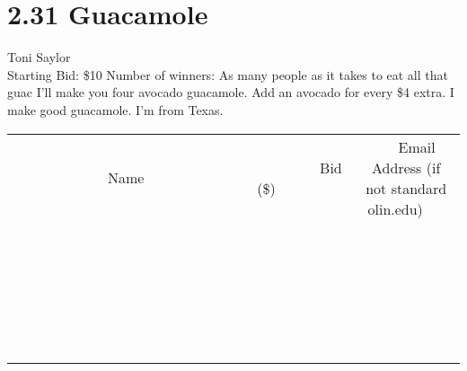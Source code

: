 \documentclass[11pt]{article}
\begin{document}
\section*{2.31 Guacamole}
Toni Saylor
\\
Starting Bid: \$10
\newline
Number of winners: As many people as it takes to eat all that guac
\newline
I'll make you four avocado guacamole. Add an avocado for every \$4 extra. I make good guacamole. I'm from Texas.
\\[6ex]
\begin{tabular}{c c c}
~~~~~~~~~~~~~Name~~~~~~~~~~~~~ & ~~~~~~~~~Bid (\$)~~~~~~~~~  & ~~~Email Address (if not standard olin.edu)~~~\\
 & & \\
\hline
 & & \\
\hline
 & & \\
\hline
 & & \\
\hline
 & & \\
\hline
 & & \\
\hline
 & & \\
\hline
 & & \\
\hline
 & & \\
\hline
 & & \\
\hline
 & & \\
\hline
 & & \\
\hline
 & & \\
\hline
 & & \\
\hline
 & & \\
\hline
 & & \\
\hline
 & & \\
\hline
 & & \\
\hline
 & & \\
\hline
 & & \\
\hline
 & & \\
\hline
 & & \\
\hline
 & & \\
\hline
 & & \\
\hline
 & & \\
\hline
 & & \\
\hline
\end{tabular}
\newpage
\end{document}
